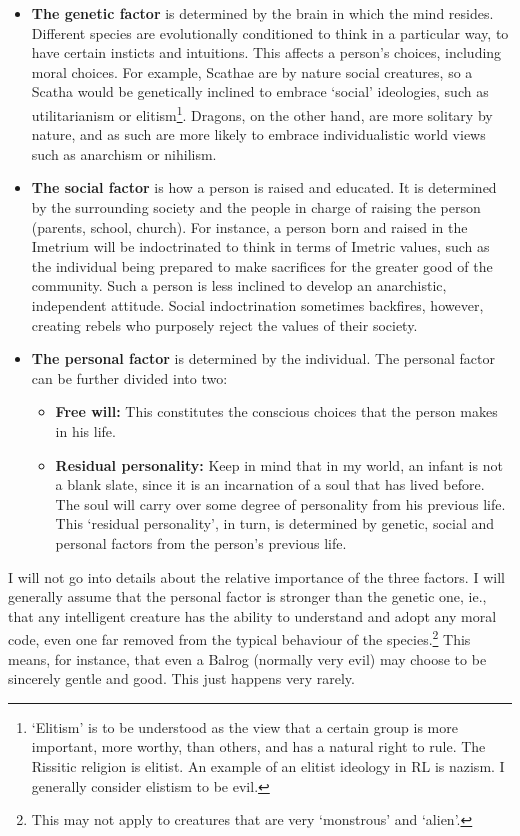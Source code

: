\begin{itemize}
  \item \textbf{The genetic factor} is determined by the brain in which the mind resides. Different species are evolutionally conditioned to think in a particular way, to have certain insticts and intuitions. This affects a person's choices, including moral choices. For example, Scathae are by nature social creatures, so a Scatha would be genetically inclined to embrace `social' ideologies, such as utilitarianism or elitism\footnote{`Elitism' is to be understood as the view that a certain group is more important, more worthy, than others, and has a natural right to rule. The Rissitic religion is elitist. An example of an elitist ideology in RL is nazism. I generally consider elistism to be evil.}. Dragons, on the other hand, are more solitary by nature, and as such are more likely to embrace individualistic world views such as anarchism or nihilism. 
  \item \textbf{The social factor} is how a person is raised and educated. It is determined by the surrounding society and the people in charge of raising the person (parents, school, church). For instance, a person born and raised in the Imetrium will be indoctrinated to think in terms of Imetric values, such as the individual being prepared to make sacrifices for the greater good of the community. Such a person is less inclined to develop an anarchistic, independent attitude. Social indoctrination sometimes backfires, however, creating rebels who purposely reject the values of their society. 
  \item \textbf{The personal factor} is determined by the individual. The personal factor can be further divided into two: 
  \begin{itemize}
    \item \textbf{Free will:} This constitutes the conscious choices that the person makes in his life. 
    \item \textbf{Residual personality:} Keep in mind that in my world, an infant is not a blank slate, since it is an incarnation of a soul that has lived before. The soul will carry over some degree of personality from his previous life. This `residual personality', in turn, is determined by genetic, social and personal factors from the person's previous life. 
  \end{itemize} 
\end{itemize} 



I will not go into details about the relative importance of the three factors. I will generally assume that the personal factor is stronger than the genetic one, ie., that any intelligent creature has the ability to understand and adopt any moral code, even one far removed from the typical behaviour of the species.\footnote{This may not apply to creatures that are very `monstrous' and `alien'.} This means, for instance, that even a Balrog (normally very evil) may choose to be sincerely gentle and good. This just happens very rarely. 




